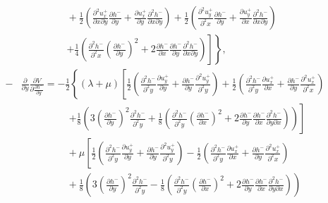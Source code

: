 \documentclass[aps,prx,10pt,twocolumn,superscriptaddress]{revtex4}
\begin{document}
\begin{widetext}
\begin{align}
&\ \ \ \ \ \ \ \ \ \ \ \ \ \ \ \ \ \ \ \ \ +\frac{1}{2}\left(\frac{\partial^{2}u^{+}_{x}}{\partial x\partial y}\frac{\partial h^{-}}{\partial y}+\frac{\partial u^{+}_{x}}{\partial y}\frac{\partial^{2}h^{-}}{\partial x\partial y}\right)+\frac{1}{2}\left( \frac{\partial^{2}u^{+}_{y}}{\partial^{2}x}\frac{\partial h^{-}}{\partial y}+\frac{\partial u^{+}_{y}}{\partial x}\frac{\partial^{2}h^{-}}{\partial x\partial y } \right)\nonumber\\
&\ \ \ \ \ \ \ \ \ \ \ \ \ \ \ \ \ \ \ \ \ \left.\left.+\frac{1}{4}\left( \frac{\partial^{2}h^{-}}{\partial^{2}x}\left( \frac{\partial h^{-}}{\partial y} \right)^{2}+2\frac{\partial h^{-}}{\partial x}\frac{\partial h^{-}}{\partial y}\frac{\partial^{2} h^{-}}{\partial x\partial y} \right)\right]\right\},\nonumber\\
-&\frac{\partial}{\partial y}\frac{\partial V}{\partial \frac{\partial h^{-}}{\partial y}}=-\frac{1}{2}\left\{(\lambda+\mu) \left[ \frac{1}{2}\left( \frac{\partial^{2}h^{-}}{\partial^{2}y}\frac{\partial u^{+}_{y}}{\partial y}+\frac{\partial h^{-}}{\partial y}\frac{\partial^{2}u^{+}_{y}}{\partial^{2}y} \right)+\frac{1}{2}\left( \frac{\partial^{2}h^{-}}{\partial^{2}y}\frac{\partial u^{+}_{x}}{\partial x}+\frac{\partial h^{-}}{\partial y}\frac{\partial^{2}u^{+}_{x}}{\partial^{2}x} \right) \right. \right.\nonumber\\
&\ \ \ \ \ \ \ \ \ \ \ \ \ \ \ \ \ \ \ \ \ \ \left.+\frac{1}{8}\left(3\left(\frac{\partial h^{-}}{\partial y}\right)^{2}\frac{\partial^{2}h^{-}}{\partial^{2}y}+\frac{1}{8}\left(\frac{\partial^{2}h^{-}}{\partial^{2}y}\left(\frac{\partial h^{-}}{\partial x}\right)^{2}+2\frac{\partial h^{-}}{\partial y}\frac{\partial h^{-}}{\partial x}\frac{\partial^{2} h^{-}}{\partial y\partial x}\right)\right)\right]\nonumber\\
&\ \ \ \ \ \ \ \ \ \ \ \ \ \ \ \ \ \ \ \ \ +\mu\left[ \frac{1}{2}\left(  \frac{\partial^{2}h^{-}}{\partial^{2}y}\frac{\partial u^{+}_{y}}{\partial y}+\frac{\partial h^{-}}{\partial y}\frac{\partial^{2}u^{+}_{y}}{\partial^{2}y} \right) - \frac{1}{2}\left( \frac{\partial^{2}h^{-}}{\partial^{2}y}\frac{\partial u^{+}_{x}}{\partial x}+\frac{\partial h^{-}}{\partial y}\frac{\partial^{2}u^{+}_{x}}{\partial^{2}x} \right) \right.\nonumber\\
&\ \ \ \ \ \ \ \ \ \ \ \ \ \ \ \ \ \ \ \ \ +\frac{1}{8}\left(3\left(\frac{\partial h^{-}}{\partial y}\right)^{2}\frac{\partial^{2}h^{-}}{\partial^{2}y}-\frac{1}{8}\left(\frac{\partial^{2}h^{-}}{\partial^{2}y}\left(\frac{\partial h^{-}}{\partial x}\right)^{2}+2\frac{\partial h^{-}}{\partial y}\frac{\partial h^{-}}{\partial x}\frac{\partial^{2} h^{-}}{\partial y\partial x}\right)\right)\nonumber\\

\end{align}
\end{widetext}
\end{document}
